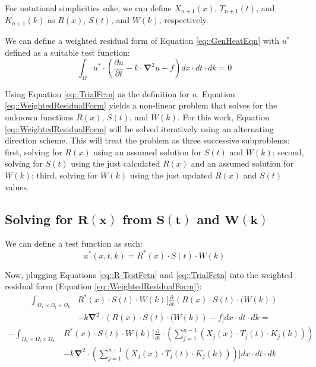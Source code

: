 \documentclass{article}
\def\ds{\displaystyle}
\def\pd{\partial}
\def\grad{\mathbf\nabla}
\begin{document}
For notational simplicities sake, we can define $X_{n+1}(x)$, $T_{n+1}(t)$, and $K_{n+1}(k)$ as $R(x)$, $S(t)$, and $W(k)$, respectively.

We can define a weighted residual form of Equation \ref{eq::GenHeatEqn} with $u^*$ defined as a suitable test function:
\begin{equation}
\label{eq::WeightedResidualForm}
\ds\int_{\Omega} u^* \cdot\left(\frac{\pd u}{\pd t} -k\cdot\grad^2 u -f \right) dx \cdot dt \cdot dk = 0
\end{equation}

Using Equation \ref{eq::TrialFctn} as the definition for $u$, Equation \ref{eq::WeightedResidualForm} yields a non-linear problem that solves for the unknown functions $R(x)$, $S(t)$, and $W(k)$. For this work, Equation \ref{eq::WeightedResidualForm} will be solved iteratively using an alternating direction scheme. This will treat the problem as three successive subproblems: first, solving for $R(x)$ using an assumed solution for $S(t)$ and $W(k)$; second, solving for $S(t)$ using the just calculated $R(x)$ and an assumed solution for $W(k)$; third, solving for $W(k)$ using the just updated $R(x)$ and $S(t)$ values.

\subsection{Solving for $\mathbf{R(x)}$ from $\mathbf{S(t)}$ and $\mathbf{W(k)}$}
We can define a test function as such:
\begin{equation}
\label{eq::R-TestFctn}
u^*(x,t,k) = R^*(x) \cdot S(t) \cdot W(k)
\end{equation}

Now, plugging Equations \ref{eq::R-TestFctn} and \ref{eq::TrialFctn} into the weighted residual form (Equation \ref{eq::WeightedResidualForm}):
\begin{align*}
\ds\int_{\Omega_x \times \Omega_t \times \Omega_k} & R^*(x) \cdot S(t) \cdot W(k) \bigg[ \frac{\pd}{\pd t} \left( R(x) \cdot S(t) \cdot (W(k) \right) \\
&  -k\grad^2 \cdot \left( R(x) \cdot S(t) \cdot (W(k) \right) -f \bigg] dx \cdot dt \cdot dk =
\end{align*}
\begin{align}
\label{eq::R-1}
- \ds\int_{\Omega_x \times \Omega_t \times \Omega_k} & R^*(x) \cdot S(t) \cdot W(k) \Bigg[\frac{\pd}{\pd t} \cdot \left( \ds\sum_{j=1}^{n-1} \left(X_j(x) \cdot T_j(t) \cdot K_j(k)\right)\right)\nonumber\\
&  - k\grad^2 \cdot \left( \ds\sum_{j=1}^{n-1} \left(X_j(x) \cdot T_j(t) \cdot K_j(k)\right) \right)\Bigg] dx \cdot dt \cdot dk
\end{align}
\end{document}
